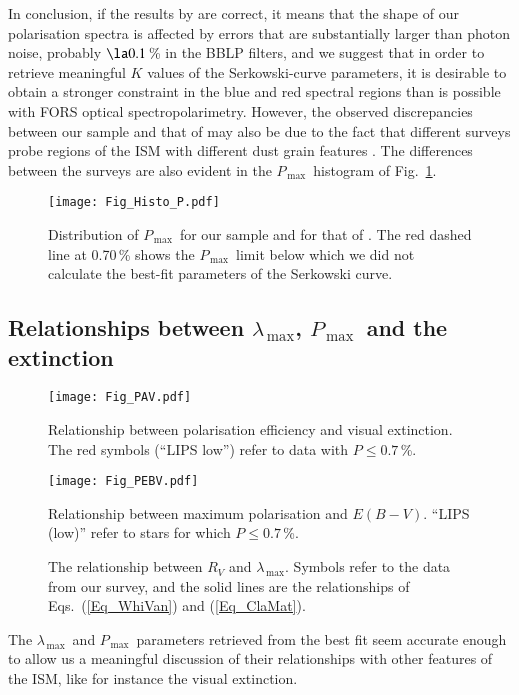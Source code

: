 \documentclass[a4paper]{aa}
\newcommand{\pl}{\ensuremath{P}}
\newcommand{\lmax}{\ensuremath{\lambda_\mathrm{\,max}}}
\newcommand{\pmax}{\ensuremath{P_\mathrm{\,max}}}
\begin{document}
In conclusion, if the results by \citet{Whietal92} are correct, it
means that the shape of our polarisation spectra is affected by errors
that are substantially larger than photon noise, probably $\la
0.1$\,\% in the BBLP filters, and we suggest that in order to retrieve
meaningful $K$ values of the Serkowski-curve parameters, it is
desirable to obtain a stronger constraint in the blue and red spectral
regions than is possible with FORS optical
spectropolarimetry. However, the observed discrepancies between our
sample and that of \citet{Whietal92} may also be due to the fact that
different surveys probe regions of the ISM with different dust grain
features \citep[e.g.][]{Vos12}. The differences between the surveys
are also evident in the \pmax\ histogram of Fig.~\ref{Fig_Histo_Serk}.


\begin{figure}
  \texttt{[image: Fig\_Histo\_P.pdf]}\\
  \caption{\label{Fig_Histo_Serk} Distribution
    of \pmax\ for our sample and for that of \citet{Whietal92}. The red dashed
     line at 0.70\,\% shows the \pmax\ limit below which we did not calculate the best-fit
    parameters of the Serkowski curve.
  }
\end{figure}

\subsection{Relationships between \lmax, \pmax\ and the extinction}
\begin{figure}
  \texttt{[image: Fig\_PAV.pdf]}\\
  \caption{\label{Fig_PAV} Relationship between polarisation efficiency and
    visual extinction. The red symbols (``LIPS low'') refer to data with $\pl \le 0.7$\,\%.
  }
\end{figure}
\begin{figure}
  \texttt{[image: Fig\_PEBV.pdf]}\\
  \caption{\label{Fig_PEBV} Relationship between maximum polarisation and
    $E(B-V)$. ``LIPS (low)'' refer to stars for which $\pl \le 0.7$\,\%.
  }
\end{figure}
\begin{figure}
  \caption{\label{Fig_Rlmax} The relationship between $R_V$ and \lmax.
    Symbols refer to the data from our survey, and the solid lines
    are the relationships of Eqs.~(\ref{Eq_WhiVan}) and (\ref{Eq_ClaMat}).
  }
\end{figure}
The \lmax\ and \pmax\ parameters retrieved from the best fit seem
accurate enough to allow us a meaningful discussion of their
relationships with other features of the ISM, like for instance the
visual extinction.
\end{document}
